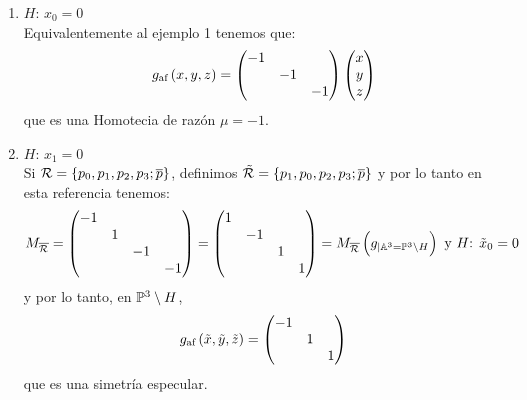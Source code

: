 \begin{example}
\begin{enumerate}
            \begin{enumerate}
                \item $H$: $x_0=0$\\
                Equivalentemente al ejemplo 1 tenemos que:
                \[
                g_\text{af}\left( x,y,z \right) =
                \begin{pmatrix}
                -1 & &\\
                & -1 &\\
                & & -1\\
                \end{pmatrix}
                \begin{pmatrix}
                x\\
                y\\
                z\\
                \end{pmatrix}
                \]
                que es una Homotecia de razón $\mu = -1$. 
                \item $H$: $x_1=0$\\
                 Si $\mathcal{R} = \{p_0, p_1, p_2, p_3; \overline{p} \}$, definimos $\tilde{\mathcal{R}}=\{p_1, p_0, p_2, p_3; \overline{p} \}$ y por lo tanto en esta referencia tenemos:
                 \[
                    M_{\overline{\mathcal{R}}} =
                    \begin{pmatrix}
                    -1 & & &\\
                    & 1 & &\\
                    & & -1 &\\
                    & & & -1\\
                    \end{pmatrix} =
                    \begin{pmatrix}
                    1 & & &\\
                    & -1 & &\\
                    & & 1 &\\
                    & & & 1\\
                    \end{pmatrix} = M_{\overline{\mathcal{R}}} \left( g_{|\mathbb{A}^3 = \mathbb{P}^3\setminus H}\right)
                    \text{ y }
                    H\text{: }\tilde{x}_0 = 0
                \]
                y por lo tanto, en $\mathbb{P}^3\setminus H$,
                \[
                g_\text{af} \left( \tilde{x},\tilde{y},\tilde{z} \right) =
                \begin{pmatrix}
                    -1 & &\\
                    & 1 &\\
                    & & 1\\
                \end{pmatrix}
                \]
                que es una simetría especular.
            \end{enumerate}
        \end{enumerate}
    \end{example}
    
